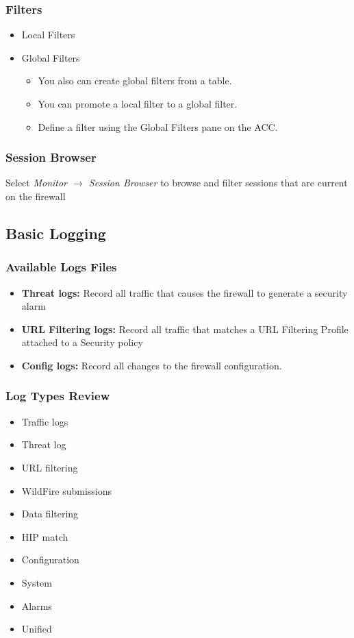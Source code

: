 \subsubsection{Filters}
\begin{itemize}
    \item Local Filters
    \item Global Filters
        \begin{itemize}
            \item You also can create global filters from a table.
            \item You can promote a local filter to a global filter.
            \item Define a filter using the Global Filters pane on the ACC.
        \end{itemize}
\end{itemize}

\subsubsection{Session Browser}
Select \textit{Monitor $\rightarrow$ Session Browser} to browse and filter sessions that are current on the firewall

\subsection{Basic Logging}
\subsubsection{Available Logs Files}
\begin{itemize}
    \item \textbf{Threat logs:} Record all traffic that causes the firewall to generate a security alarm
    \item \textbf{URL Filtering logs:} Record all traffic that matches a URL Filtering Profile attached to a Security policy
    \item \textbf{Config logs:} Record all changes to the firewall configuration.
\end{itemize}

\subsubsection{Log Types Review}
\begin{itemize}
    \item Traffic logs
    \item Threat log
    \item URL filtering
    \item WildFire submissions
    \item Data filtering
    \item HIP match
    \item Configuration
    \item System
    \item Alarms
    \item Unified
\end{itemize}

